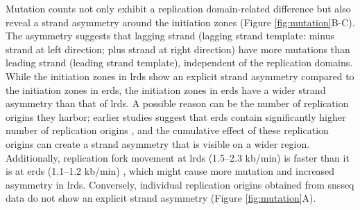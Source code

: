 Mutation counts not only exhibit a replication domain-related difference but also reveal a strand asymmetry around the initiation zones (Figure \ref{fig:mutation}B-C). The asymmetry suggests that lagging strand (lagging strand template: minus strand at left direction; plus strand at right direction) have more mutations than leading strand (leading strand template), independent of the replication domains. While the initiation zones in \gls{lrd}s show an explicit strand asymmetry compared to the initiation zones in \gls{erd}s, the initiation zones in \gls{erd}s have a wider strand asymmetry than that of \gls{lrd}s. A possible reason can be the number of replication origins they harbor; earlier studies suggest that \gls{erd}s contain significantly higher number of replication origins \citep{besnard2012unraveling}, and the cumulative effect of these replication origins can create a strand asymmetry that is visible on a wider region. Additionally, replication fork movement at \gls{lrd}s (1.5–2.3 \gls{kb}/min) is faster than it is at \gls{erd}s (1.1–1.2 \gls{kb}/min) \citep{takebayashi2005regulation}, which might cause more mutation and increased asymmetry in \gls{lrd}s. Conversely, individual replication origins obtained from \gls{snsseq} data do not show an explicit strand asymmetry (Figure \ref{fig:mutation}A).

